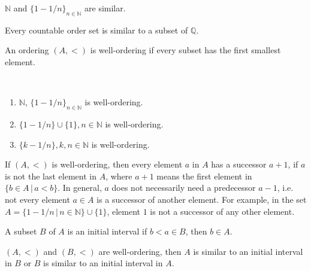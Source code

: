 \medskip

\begin{example}
$\mathbb{N}$ and $\{1 - 1/n\}_{n \in \mathbb{N}}$ are similar.
\end{example}

\medskip

\begin{theorem}
Every countable order set is similar to a subset of $\mathbb{Q}$.
\end{theorem}

\medskip

\begin{definition}
An ordering $(A,<)$ is well-ordering if every subset has the first smallest element.
\end{definition}

\medskip

\begin{example}
~\begin{enumerate}[label=(\alph*)]
    \item $\mathbb{N}$, $\{1 - 1/n\}_{n \in \mathbb{N}}$ is well-ordering.
    
    \item $\{1 - 1/n\} \cup \{1\}, n \in \mathbb{N}$ is well-ordering.
    
    \item $\{k - 1/n\}, k,n \in \mathbb{N}$ is well-ordering.
\end{enumerate}
\end{example}

\medskip

If $(A,<)$ is well-ordering, then every element $a$ in $A$ has a successor $a+1$, if $a$ is not the last element in $A$, where $a+1$ means the first element in $\{b \in A\, | \, a < b\}$. In general, $a$ does not necessarily need a predecessor $a-1$, i.e. not every element $a \in A$ is a successor of another element. For example, in the set $A = \{1 - 1/n\,|\, n\in \mathbb{N}\} \cup \{1\}$, element $1$ is not a successor of any other element.

\medskip

\begin{definition}
A subset $B$ of $A$ is an initial interval if $b < a \in B$, then $b \in A$.
\end{definition}

\medskip

\begin{theorem}
$(A,<)$ and $(B,<)$ are well-ordering, then $A$ is similar to an initial interval in $B$ or $B$ is similar to an initial interval in $A$.
\end{theorem}

